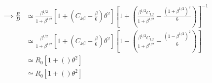\begin{align}
  \implies \frac{R}{D} &\simeq \frac{\beta^{1/2}}{1 + \beta^{1/2}}\left[1 + \left(C_{k\beta} - \frac{\beta}{6}\right)\theta^2\right]
                         \left[1 + \left(\frac{\beta^{1/2}C_{k\beta}}{1 + \beta^{1/2}} - \frac{\left(1 + \beta^{1/2}\right)^2}{6}\right)\right]^{-1} \\
  &\simeq \frac{\beta^{1/2}}{1 + \beta^{1/2}}\left[1 + \left(C_{k\beta} - \frac{\beta}{6}\right)\theta^2\right]
    \left[1 - \left(\frac{\beta^{1/2}C_{k\beta}}{1 + \beta^{1/2}} - \frac{\left(1 - \beta^{1/2}\right)^2}{6}\right)\right] \\
           &\simeq R_0\left[1 + \left(\right)\theta^2\right] \\
  &\simeq R_0 \left[1 + \left(\right)\theta^2\right] 
\end{align}
